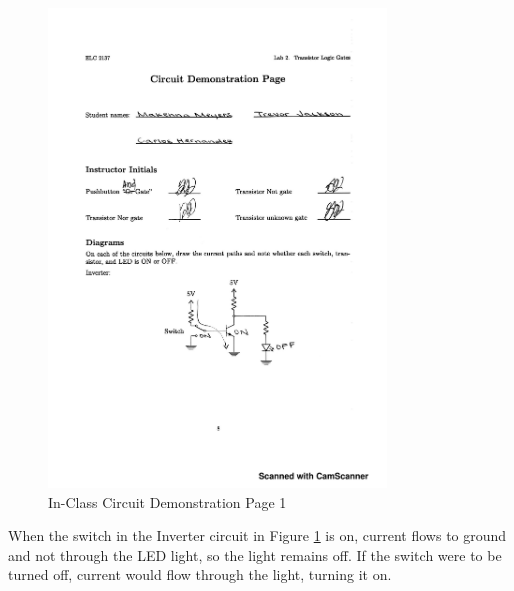 \documentclass[11pt]{article}
\begin{document}
\begin{figure}\centering
	\includegraphics[width=0.8\textwidth,trim=2cm 6cm 2cm 2cm,clip]{Circuit_Demonstration} 
	\caption{In-Class Circuit Demonstration Page 1}
	\label{fig:Circuit_Demonstration(1)}
\end{figure}	

When the switch in the Inverter circuit in Figure \ref{fig:Circuit_Demonstration(1)} is on, current flows to ground and not through the LED light, so the light remains off. If the switch were to be turned off, current would flow through the light, turning it on.
	
	\clearpage
	
\end{document}

